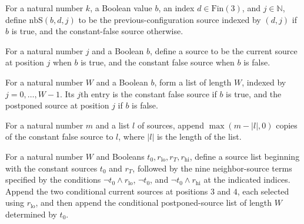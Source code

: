 \begin{definition}
\label{Complexity.UTab.nbS}
\leanok
{}
For a natural number $k$, a Boolean value $b$, an index $d \in \mathrm{Fin}(3)$, and $j
\in \mathbb{N}$, define $\mathrm{nbS}(b,d,j)$ to be the previous-configuration source
indexed by $(d,j)$ if $b$ is true, and the constant-false source otherwise.
\end{definition}

\begin{definition}
\label{Complexity.UTab.chS}
\leanok
{}
For a natural number $j$ and a Boolean $b$, define a source to be the current source at
position $j$ when $b$ is true, and the constant false source when $b$ is false.
\end{definition}

\begin{definition}
\label{Complexity.UTab.psnS}
\leanok
{}
For a natural number $W$ and a Boolean $b$, form a list of length $W$, indexed by
$j=0,\ldots,W-1$. Its $j$th entry is the constant false source if $b$ is true, and the
postponed source at position $j$ if $b$ is false.
\end{definition}

\begin{definition}
\label{Complexity.UTab.padS}
\leanok
{}
For a natural number $m$ and a list $l$ of sources, append $\max(m-|l|,0)$ copies of the
constant false source to $l$, where $|l|$ is the length of the list.
\end{definition}

\begin{definition}
\label{Complexity.UTab.cellS}
\leanok
{}
For a natural number $W$ and Booleans $t_0,r_{\mathrm{lo}},r_T,r_{\mathrm{hi}}$, define
a source list beginning with the constant sources $t_0$ and $r_T$, followed by the nine
neighbor-source terms specified by the conditions $\neg t_0\land r_{\mathrm{lo}}$, $\neg
t_0$, and $\neg t_0\land r_{\mathrm{hi}}$ at the indicated indices. Append the two
conditional current sources at positions $3$ and $4$, each selected using
$r_{\mathrm{lo}}$, and then append the conditional postponed-source list of length $W$
determined by $t_0$.
\end{definition}

